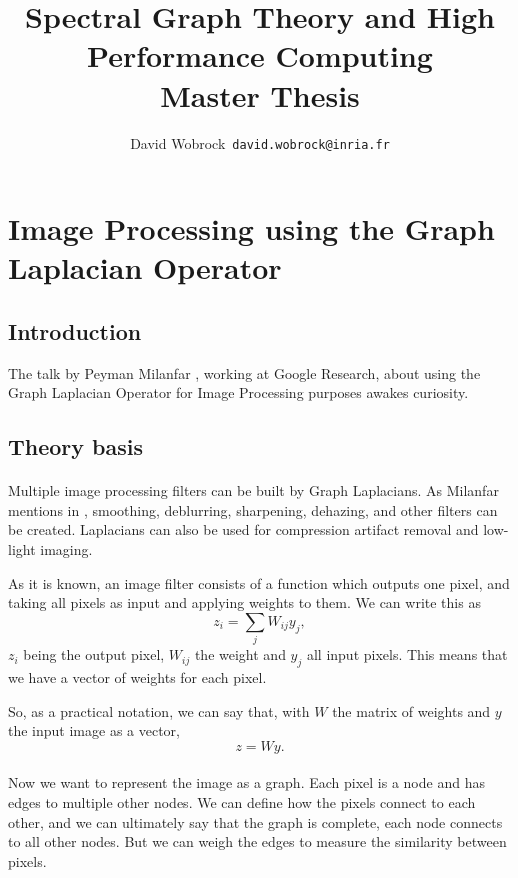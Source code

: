 \documentclass[]{article}
\title{Spectral Graph Theory and High Performance Computing \\ Master Thesis}
\author{David Wobrock\ \texttt{david.wobrock@inria.fr}}
\begin{document}
\begin{titlepage}
 \maketitle
\end{titlepage}

\tableofcontents
\newpage

\section{Image Processing using the Graph Laplacian Operator}

\subsection{Introduction}

The talk by Peyman Milanfar \cite{siam_slides_2016}, working at Google Research, about using the Graph Laplacian Operator for Image Processing purposes awakes curiosity.

\subsection{Theory basis}

\paragraph{}
Multiple image processing filters can be built by Graph Laplacians. As Milanfar mentions in \cite{siam_slides_2016}, smoothing, deblurring, sharpening, dehazing, and other filters can be created. Laplacians can also be used for compression artifact removal and low-light imaging.

As it is known, an image filter consists of a function which outputs one pixel, and taking all pixels as input and applying weights to them. We can write this as
\[z_i = \sum_j W_{ij}y_j,\]
\(z_i\) being the output pixel, \(W_{ij}\) the weight and \(y_j\) all input pixels.
This means that we have a vector of weights for each pixel.

So, as a practical notation, we can say that, with \(W\) the matrix of weights and \(y\) the input image as a vector,
\[z = Wy.\]

\paragraph{}
Now we want to represent the image as a graph.
Each pixel is a node and has edges to multiple other nodes.
We can define how the pixels connect to each other, and we can ultimately say that the graph is complete, each node connects to all other nodes.
But we can weigh the edges to measure the similarity between pixels.
\end{document}
